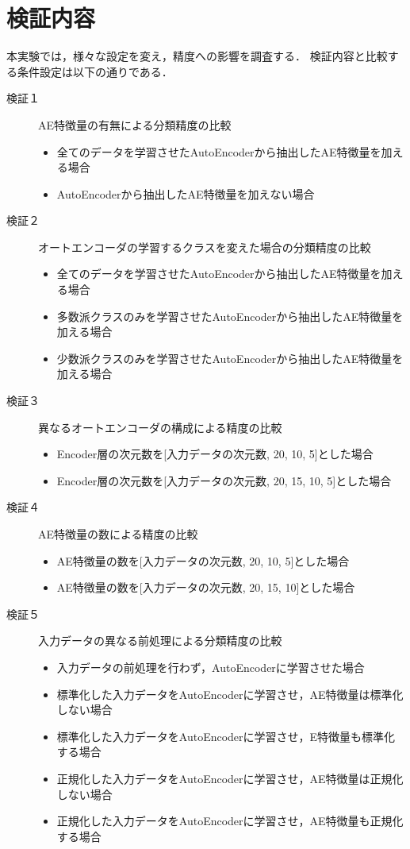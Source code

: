 \section{検証内容}
本実験では，様々な設定を変え，精度への影響を調査する．
検証内容と比較する条件設定は以下の通りである．

\begin{description}
    \item [検証１] AE特徴量の有無による分類精度の比較
    \begin{itemize}
        \item 全てのデータを学習させたAutoEncoderから抽出したAE特徴量を加える場合
        \item AutoEncoderから抽出したAE特徴量を加えない場合
    \end{itemize}

    \item [検証２] オートエンコーダの学習するクラスを変えた場合の分類精度の比較
    \begin{itemize}
        \item 全てのデータを学習させたAutoEncoderから抽出したAE特徴量を加える場合
        \item 多数派クラスのみを学習させたAutoEncoderから抽出したAE特徴量を加える場合
        \item 少数派クラスのみを学習させたAutoEncoderから抽出したAE特徴量を加える場合
    \end{itemize}

    \item [検証３] 異なるオートエンコーダの構成による精度の比較
    \begin{itemize}
        \item Encoder層の次元数を[入力データの次元数, 20, 10, 5]とした場合
        \item Encoder層の次元数を[入力データの次元数, 20, 15, 10, 5]とした場合
    \end{itemize}

    \item [検証４] AE特徴量の数による精度の比較
    \begin{itemize}
        \item AE特徴量の数を[入力データの次元数, 20, 10, 5]とした場合
        \item AE特徴量の数を[入力データの次元数, 20, 15, 10]とした場合
    \end{itemize}

    \item [検証５] 入力データの異なる前処理による分類精度の比較
    \begin{itemize}
        \item 入力データの前処理を行わず，AutoEncoderに学習させた場合
        \item 標準化した入力データをAutoEncoderに学習させ，AE特徴量は標準化しない場合
        \item 標準化した入力データをAutoEncoderに学習させ，E特徴量も標準化する場合
        \item 正規化した入力データをAutoEncoderに学習させ，AE特徴量は正規化しない場合
        \item 正規化した入力データをAutoEncoderに学習させ，AE特徴量も正規化する場合
    \end{itemize}


\end{description}
